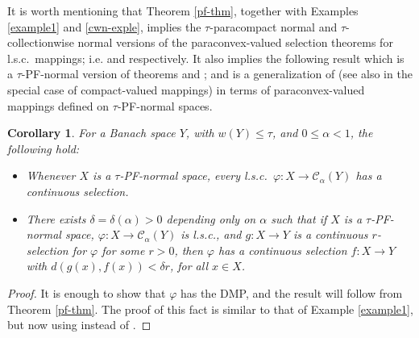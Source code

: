 \documentclass[12pt,a4paper,fleqn,leqno]{amsart}
\theoremstyle{plain}
\newtheorem{corollary}[theorem]{Corollary}
\theoremstyle{definition}
\numberwithin{equation}{section}
\begin{document}
It is worth mentioning that Theorem \ref{pf-thm}, together with Examples \ref{example1} and \ref{cwn-exple}, implies the $\tau$-paracompact normal and $\tau$-collectionwise normal versions of the paraconvex-valued selection theorems for l.s.c.\ mappings; i.e. \cite[Theorem 3.2]{loufouma} and \cite[Theorem 2.1]{loufouma} respectively. It also implies the following result which is a $\tau$-PF-normal version of theorems \cite[Theorem 2.1]{loufouma} and \cite[Theorem 2.1]{michael2}; and is a generalization of \cite[Theorem IV]{kando} (see also \cite[Theorem 4.1]{nedev} in the special case of compact-valued mappings) in terms of paraconvex-valued mappings defined on $\tau$-PF-normal spaces.

\begin{corollary}
\label{pf-thm0}For a Banach space $Y$, with $w(Y)\leq \tau$, and $0\leq\alpha<1$, the following hold\textup{:}
\begin{itemize}
\item[(a)] Whenever $X$ is a $\tau$-PF-normal space, every l.s.c.\ $\varphi:X\to \mathscr{C}_{\alpha}(Y)$ has a continuous selection.
\item[(b)] There exists $\delta=\delta(\alpha)>0$ depending only on $\alpha$ such that if $X$ is a $\tau$-PF-normal space, $\varphi:X\to\mathscr{C}_{\alpha}(Y)$ is l.s.c., and $g:X\to Y$ is a continuous $r$-selection for $\varphi$ for some $r>0$, then $\varphi$ has a continuous selection $f:X\to Y$ with $d(g(x),f(x))<\delta r$, for all $x\in X$.
\end{itemize}
\end{corollary}

\begin{proof}
It is enough to show that $\varphi$ has the DMP, and the result will follow from Theorem \ref{pf-thm}. The proof of this fact is similar to that of Example \ref{example1}, but now using \cite[Theorem 4.3]{nedev} instead of \cite[Theorem 1.1]{michael5}.
\end{proof}
\end{document}
